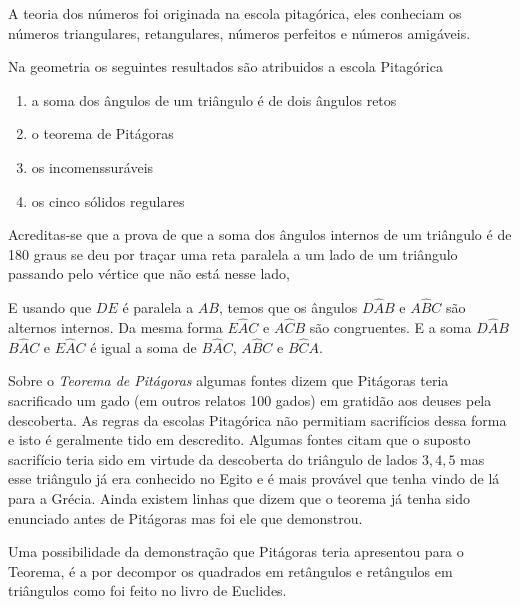 \documentclass{article}
\begin{document}
A teoria dos números foi originada na escola pitagórica, eles conheciam
os números triangulares, retangulares, números perfeitos e números amigáveis.

Na geometria os seguintes resultados são atribuidos a escola Pitagórica
\begin{enumerate}
	\item a soma dos ângulos de um triângulo é de dois ângulos retos
	\item o teorema de Pitágoras
	\item os incomenssuráveis
	\item os cinco sólidos regulares
\end{enumerate}

Acreditas-se que a prova de que a soma dos ângulos internos de um triângulo
é de 180 graus se deu por traçar uma reta paralela a um lado de um triângulo
passando pelo vértice que não está nesse lado,

\begin{center}
\end{center}
E usando que $DE$ é paralela a $AB$, temos que os ângulos $D \widehat A B$ 
e $A \widehat BC$ são alternos internos. Da mesma forma $E \widehat A C$ e 
$A \widehat C B$ são congruentes. E a soma $D \widehat AB$ $B \widehat AC$ e
$E \widehat AC$ é igual a soma de $B \widehat A C$, $A \widehat BC$ e $B \widehat C A$.


Sobre o \emph{Teorema de Pitágoras} algumas fontes dizem que Pitágoras 
teria sacrificado um gado (em outros relatos 100 gados) em gratidão aos
deuses pela descoberta. As regras da escolas Pitagórica não permitiam
sacrifícios dessa forma e isto é geralmente tido em descredito. Algumas 
fontes citam que o suposto sacrifício teria sido em virtude da descoberta
do triângulo de lados $3, 4, 5$ mas esse triângulo já era conhecido
no Egito e é mais provável que tenha vindo de lá para a Grécia. Ainda 
existem linhas que dizem que o teorema já tenha sido enunciado antes de 
Pitágoras mas foi ele que demonstrou.

Uma possibilidade da demonstração que Pitágoras teria apresentou para o Teorema, 
é a por decompor os quadrados em retângulos e retângulos em triângulos como foi 
feito no livro de Euclides.
\end{document}
